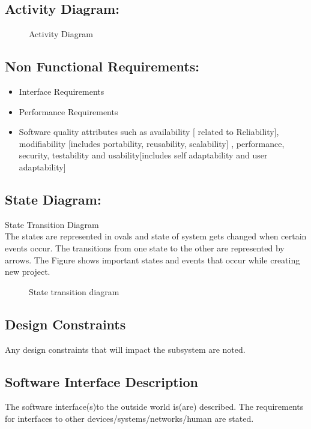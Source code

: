 \documentclass[oneside,a4paper,12pt]{book}
\begin{document}
\begin{enumerate}
\begin{itemize}
 
\subsection{Activity Diagram:}
\begin{center}
	\begin{figure}[!htbp]
		\centering
		\fbox{\texttt{[image: ad]}}
	  \caption{Activity Diagram}
	  \label{fig:usecase}
	\end{figure}
\end{center} 
\newpage

\subsection{Non Functional Requirements:}
\begin{itemize}
	\item	Interface Requirements
	\item	Performance Requirements
    \item	Software quality attributes such as availability [ related to Reliability], modifiability [includes portability, reusability, scalability] ,  		performance, security, testability and usability[includes self 			adaptability and user adaptability] 
\end{itemize} 

\subsection{State Diagram:}	
  State Transition Diagram\\
The states are
represented in ovals and state of system gets changed when certain events occur. The transitions from one state to the other are represented by arrows. The Figure    shows important states and events that occur while creating new project.

\begin{center}
	\begin{figure}[!htbp]
		\centering
	  \caption{State transition diagram}
	  \label{fig:state-dig}
	\end{figure}
\end{center} 
 
 \subsection{Design Constraints}	
Any design constraints that will impact the subsystem are noted.
 \subsection{Software Interface Description}	 
The software interface(s)to the outside world is(are) described.
The requirements for interfaces to other devices/systems/networks/human are stated.




\end{itemize}
\end{enumerate}
\end{document}
